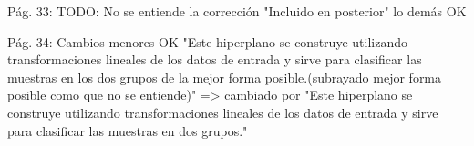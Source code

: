 Pág. 33: 
TODO: No se entiende la corrección "Incluido en posterior"
lo demás OK

Pág. 34:
Cambios menores OK
"Este hiperplano se construye utilizando transformaciones lineales de los datos de entrada y sirve para clasificar las muestras en los dos grupos de la mejor forma posible.(subrayado mejor forma posible como que no se entiende)" => cambiado por 
"Este hiperplano se construye utilizando transformaciones lineales de los datos de entrada y sirve para clasificar las muestras en dos grupos."